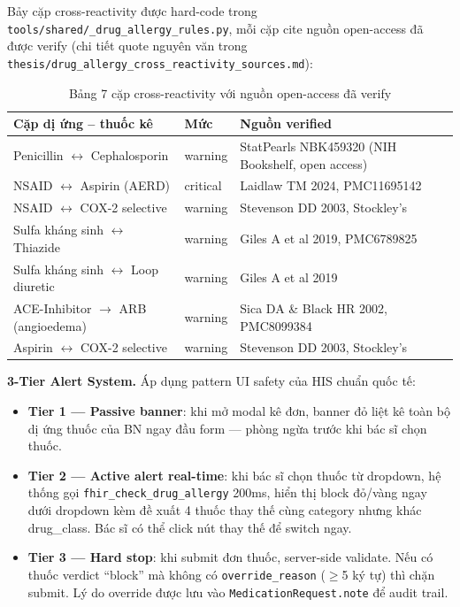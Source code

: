 \documentclass[a4paper,13pt,3p,twoside,openany]{report}
\theoremstyle{definition}
\theoremstyle{remark}
\theoremstyle{definition}
\begin{document}
Bảy cặp cross-reactivity được hard-code trong \texttt{tools/shared/\_drug\_allergy\_rules.py}, mỗi cặp cite nguồn open-access đã được verify (chi tiết quote nguyên văn trong \texttt{thesis/drug\_allergy\_cross\_reactivity\_sources.md}):

\begin{table}[H]
\centering
\begin{tabular}{|p{4.5cm}|p{2cm}|p{6.5cm}|}
\hline
\textbf{Cặp dị ứng -- thuốc kê} & \textbf{Mức} & \textbf{Nguồn verified} \\
\hline
Penicillin $\leftrightarrow$ Cephalosporin & warning & StatPearls NBK459320 (NIH Bookshelf, open access) \\
\hline
NSAID $\leftrightarrow$ Aspirin (AERD) & critical & Laidlaw TM 2024, PMC11695142 \\
\hline
NSAID $\leftrightarrow$ COX-2 selective & warning & Stevenson DD 2003, Stockley's~\cite{stockley} \\
\hline
Sulfa kháng sinh $\leftrightarrow$ Thiazide & warning & Giles A et al 2019, PMC6789825 \\
\hline
Sulfa kháng sinh $\leftrightarrow$ Loop diuretic & warning & Giles A et al 2019 \\
\hline
ACE-Inhibitor $\to$ ARB (angioedema) & warning & Sica DA \& Black HR 2002, PMC8099384 \\
\hline
Aspirin $\leftrightarrow$ COX-2 selective & warning & Stevenson DD 2003, Stockley's~\cite{stockley} \\
\hline
\end{tabular}
\caption{Bảng 7 cặp cross-reactivity với nguồn open-access đã verify}
\label{tab:cross-reactivity}
\end{table}

\textbf{3-Tier Alert System.} Áp dụng pattern UI safety của HIS chuẩn quốc tế:
\begin{itemize}
  \item \textbf{Tier 1 --- Passive banner}: khi mở modal kê đơn, banner đỏ liệt kê toàn bộ dị ứng thuốc của BN ngay đầu form --- phòng ngừa trước khi bác sĩ chọn thuốc.
  \item \textbf{Tier 2 --- Active alert real-time}: khi bác sĩ chọn thuốc từ dropdown, hệ thống gọi \texttt{fhir\_check\_drug\_allergy} 200ms, hiển thị block đỏ/vàng ngay dưới dropdown kèm đề xuất 4 thuốc thay thế cùng category nhưng khác drug\_class. Bác sĩ có thể click nút thay thế để switch ngay.
  \item \textbf{Tier 3 --- Hard stop}: khi submit đơn thuốc, server-side validate. Nếu có thuốc verdict ``block'' mà không có \texttt{override\_reason} ($\geq$5 ký tự) thì chặn submit. Lý do override được lưu vào \texttt{MedicationRequest.note} để audit trail.
\end{itemize}
\end{document}
